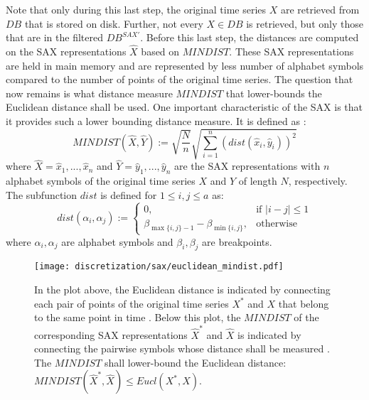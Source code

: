 Note that only during this last step, the original time series $X$ are retrieved from $DB$ that is stored on disk. Further, not every $X \in DB$ is retrieved, but only those that are in the filtered $DB^{SAX'}$. Before this last step, the distances are computed on the \ac{SAX} representations $\hat{X}$ based on $MINDIST$. These \ac{SAX} representations are held in main memory and are represented by less number of alphabet symbols compared to the number of points of the original time series. \newline
The question that now remains is what distance measure $MINDIST$ that lower-bounds the Euclidean distance shall be used. One important characteristic of the \ac{SAX} is that it provides such a lower bounding distance measure. It is defined as \cite{SAX_Lin}:
\begin{equation}
MINDIST(\hat{X},\hat{Y}) := \sqrt{\frac{N}{n}}\sqrt{\sum_{i=1}^{n} (dist(\hat{x}_i, \hat{y}_i))^2}
\label{eq:mindist}
\end{equation}
where $\hat{X} = \hat{x}_1, ..., \hat{x}_n$ and $\hat{Y} = \hat{y}_1, ..., \hat{y}_n$ are the \ac{SAX} representations with $n$ alphabet symbols of the original time series $X$ and $Y$ of length $N$, respectively. The subfunction $dist$ is defined for $1 \leq i,j \leq a$ as:
\begin{equation}
dist(\alpha_i, \alpha_j) :=
\begin{cases}
0, & \text{if } |i - j| \leq 1 \\
\beta_{\max \{i,j\}-1} - \beta_{\min \{i,j\}}, & \text{otherwise}
\end{cases}
\label{eq:dist}
\end{equation}
where $\alpha_i, \alpha_j$ are alphabet symbols and $\beta_i, \beta_j$ are breakpoints.
\begin{figure}[htb]
\centering
\texttt{[image: discretization/sax/euclidean\_mindist.pdf]}
\caption[Symbolic Aggregate Approximation - Euclidean vs. MINDIST]{In the plot above, the Euclidean distance is indicated by connecting each pair of points of the original time series $X^*$ and $X$ that belong to the same point in time \cite{SAX_Lin}. Below this plot, the $MINDIST$ of the corresponding \ac{SAX} representations $\hat{X}^*$ and $\hat{X}$ is indicated by connecting the pairwise symbols whose distance shall be measured \cite{SAX_Lin}. The $MINDIST$ shall lower-bound the Euclidean distance: $MINDIST(\hat{X}^*, \hat{X}) \leq Eucl(X^*, X)$.}
\label{fig:Euclidean_Mindist}
\end{figure}
